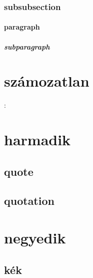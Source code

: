 \documentclass[twoside,12pt]{article}
\begin{document}
\subsubsection{subsubsection}
\paragraph{paragraph}
\label{p:paragraph}
\subparagraph{subparagraph}
\clearpage
{}
\section*{számozatlan}
\label{s:szamozatlan}
\hulipsum:
\clearpage
\appendix
\section{harmadik}
\subsection{quote}
\begin{quote}
\hulipsum[15-16]
\end{quote}

\subsection{quotation}
\begin{quotation}
\label{a:quotation}
\hulipsum[20-21]
\end{quotation}
\clearpage
\section{negyedik}
\begin{verse}
\hulipsum[100-101]
\end{verse}
\subsection{kék}
\end{document}
